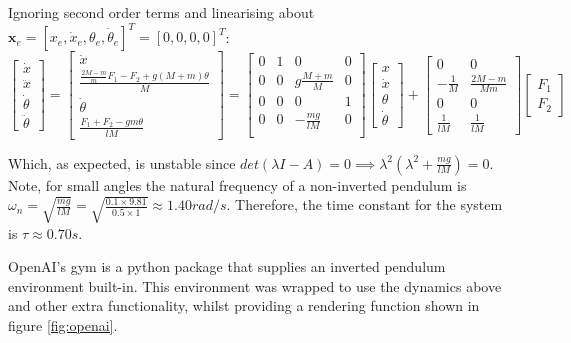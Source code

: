 \documentclass[main.tex]{subfiles}
\begin{document}
Ignoring second order terms and linearising about $\boldsymbol{x}_e = [x_e, \dot{x}_e, \theta_e, \dot{\theta}_e]^T = [0, 0, 0, 0]^T$:
\begin{equation}
\begin{bmatrix} \dot{x} \\ \ddot{x} \\ \dot{\theta} \\ \ddot{\theta} \end{bmatrix} 
=   \begin{bmatrix} 
    \dot{x} \\ 
    \frac{\frac{2M-m}{m}F_1-F_2 + g(M+m)\theta}{M} \\ 
    \dot{\theta} \\ 
    \frac{F_1 + F_2 - gm\theta}{lM} 
    \end{bmatrix}
=   \begin{bmatrix} 
    0 & 1 & 0 & 0 \\
    0 & 0 & g\frac{M+m}{M} & 0 \\
    0 & 0 & 0 & 1 \\
    0 & 0 & -\frac{mg}{lM} & 0 \\
    \end{bmatrix}
    \begin{bmatrix} x \\ \dot{x} \\ \theta \\ \dot{\theta} \end{bmatrix}
+  \begin{bmatrix} 0 & 0 \\ -\frac{1}{M} & \frac{2M-m}{Mm} \\ 0 & 0 \\ \frac{1}{lM} & \frac{1}{lM} \end{bmatrix} 
\begin{bmatrix} F_1 \\ F_2 \end{bmatrix}
\end{equation}

Which, as expected, is unstable since $det(\lambda I - A) = 0 \implies \lambda^2(\lambda^2 + \frac{mg}{lM}) = 0$. Note, for small angles the natural frequency of a non-inverted pendulum is $\omega_n = \sqrt{\frac{mg}{lM}} = \sqrt{\frac{0.1\times 9.81}{0.5\times 1}} \approx 1.40 rad/s$. Therefore, the time constant for the system is $\tau \approx 0.70s$. 

OpenAI's gym is a python package that supplies an inverted pendulum environment built-in. This environment was wrapped to use the dynamics above and other extra functionality, whilst providing a rendering function shown in figure \ref{fig:openai}.
\end{document}
